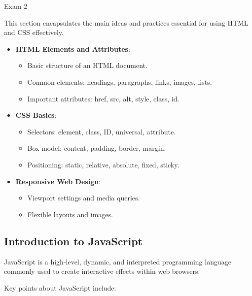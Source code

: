 \begin{examnotes}{Exam 2}
    \begin{highlight}
        This section encapsulates the main ideas and practices essential for using HTML and CSS effectively.
        \begin{itemize}
            \item \textbf{HTML Elements and Attributes}:
                \begin{itemize}
                    \item Basic structure of an HTML document.
                    \item Common elements: headings, paragraphs, links, images, lists.
                    \item Important attributes: href, src, alt, style, class, id.
                \end{itemize}
            \item \textbf{CSS Basics}:
                \begin{itemize}
                    \item Selectors: element, class, ID, universal, attribute.
                    \item Box model: content, padding, border, margin.
                    \item Positioning: static, relative, absolute, fixed, sticky.
                \end{itemize}
            \item \textbf{Responsive Web Design}:
                \begin{itemize}
                    \item Viewport settings and media queries.
                    \item Flexible layouts and images.
                \end{itemize}
        \end{itemize}
    \end{highlight}

    \subsection*{Introduction to JavaScript}

    JavaScript is a high-level, dynamic, and interpreted programming language commonly used to create interactive effects within web browsers.
    
    \begin{highlight}
        Key points about JavaScript include:
        

\end{highlight}
\end{examnotes}
